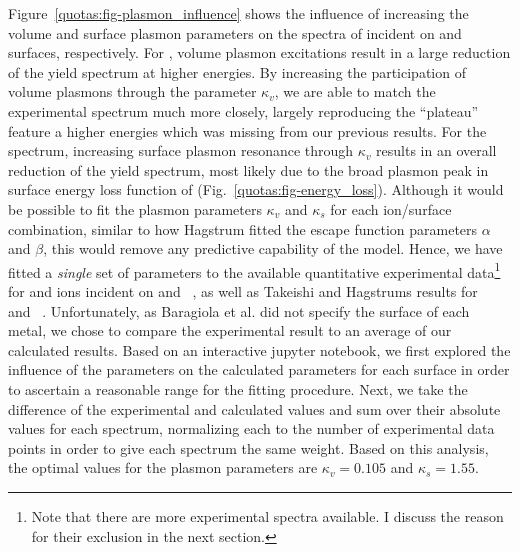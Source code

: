 \begin{refsection}
Figure~\ref{quotas:fig-plasmon_influence} shows the influence of increasing the volume and surface plasmon parameters on the spectra of  incident on  and  surfaces, respectively. For , volume plasmon excitations result in a large reduction of the yield spectrum at higher energies. By increasing the participation of volume plasmons through the parameter $\kappa_v$, we are able to match the experimental spectrum much more closely, largely reproducing the ``plateau'' feature a higher energies which was missing from our previous results. For the  spectrum, increasing surface plasmon resonance through $\kappa_v$ results in an overall reduction of the yield spectrum, most likely due to the broad plasmon peak in surface energy loss function of  (Fig.~\ref{quotas:fig-energy_loss}). Although it would be possible to fit the plasmon parameters $\kappa_v$  and $\kappa_s$ for each ion/surface combination, similar to how Hagstrum fitted the escape function parameters $\alpha$ and $\beta$, this would remove any predictive capability of the model. Hence, we have fitted a \textit{single} set of parameters to the available quantitative experimental data\footnote{Note that there are more experimental spectra available. I discuss the reason for their exclusion in the next section.} for  and  ions incident on  and ~\cite{Baragiola2001}, as well as Takeishi and Hagstrums results for ~\cite{Takeishi1965} and ~\cite{Hagstrum1966}. Unfortunately, as Baragiola et al. did not specify the surface of each metal, we chose to compare the experimental result to an average of our calculated results. Based on an interactive jupyter notebook, we first explored the influence of the parameters on the calculated parameters for each surface in order to ascertain a reasonable range for the fitting procedure. Next, we take the difference of the experimental and calculated values and sum over their absolute values for each spectrum, normalizing each to the number of experimental data points in order to give each spectrum the same weight. Based on this analysis, the optimal values for the plasmon parameters are $\kappa_v = 0.105$  and $\kappa_s = 1.55$.


\end{refsection}
